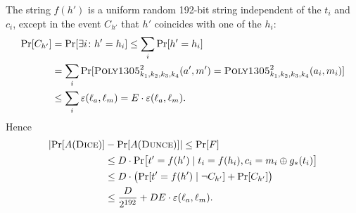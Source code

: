 \documentclass[draft]{article}
\def\operatorsc#1{{%
  \ifmmode\let\next=\operatorname\else\let\next=\relax\fi\next{\textsc{#1}}}}
\def\Poly#1/{\operatorsc{Poly#1}}
\def\DUNCE/{\operatorsc{Dunce}}
\def\DICE/{\operatorsc{Dice}}
\newcommand{\given}{\mathrel|}
\newcommand{\collisionbound}{\varepsilon}
\begin{document}
The string $f(h')$ is a uniform random 192-bit string independent of
 the $t_i$ and $c_i$, except in the event $C_{h'}$ that $h'$ coincides
 with one of the $h_i$:
%
\begin{align*}
  \Pr[C_{h'}]
  &= \Pr[\exists i\colon h' = h_i]
   \leq \sum_i \Pr[h' = h_i] \\
  &= \sum_i
       \Pr[\Poly1305/^2_{k_1,k_2,k_3,k_4}(a', m')
             = \Poly1305/^2_{k_1,k_2,k_3,k_4}(a_i, m_i)] \\
  &\leq \sum_i \collisionbound(\ell_a, \ell_m)
   = E \cdot \collisionbound(\ell_a, \ell_m).
\end{align*}
%
Hence
%
\begin{align*}
  \lvert\Pr[A(\DICE/)] &- \Pr[A(\DUNCE/)]\rvert
   \leq \Pr[F] \\
  &\leq D \cdot \Pr\bigl[t' = f(h')
            \given t_i = f(h_i), c_i = m_i \oplus g_*(t_i)\bigr] \\
  &\leq D \cdot \bigl(\Pr[t' = f(h') \given \lnot C_{h'}]
                      + \Pr[C_{h'}]\bigr) \\
  &\leq \frac{D}{2^{192}}
        + D E \cdot \collisionbound(\ell_a, \ell_m).
\end{align*}
\end{document}
